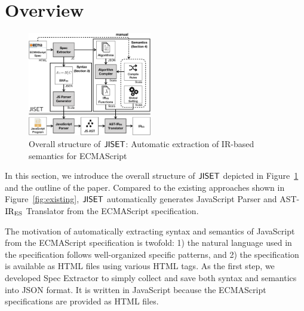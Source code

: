\section{Overview}
\begin{figure}
  \centering
  \includegraphics[width=0.48\textwidth]{img/overview.png}
  \caption{Overall structure of \( \text{\sf JISET} \): Automatic extraction of
IR-based semantics for ECMAScript}
  \label{fig:overview}
\vspace*{-1em}
\end{figure}

In this section, we introduce the overall structure of \( \text{\sf JISET} \)
depicted in Figure~\ref{fig:overview} and the outline of the paper.
Compared to the existing approaches shown in
Figure~\ref{fig:existing}, \( \text{\sf JISET} \) automatically generates
{\sf JavaScript Parser} and {\sf AST-\( \text{IR}_\text{ES} \) Translator} from the
ECMAScript specification.

The motivation of automatically extracting syntax and semantics
of JavaScript from the ECMAScript specification is twofold: 1) the
natural language used in the specification follows well-organized
specific patterns, and 2) the specification is available as HTML files
using various HTML tags.  As the first step, we developed {\sf Spec Extractor}
to simply collect and save both syntax and semantics into JSON format.
It is written in JavaScript because the ECMAScript specifications are
provided as HTML files.

